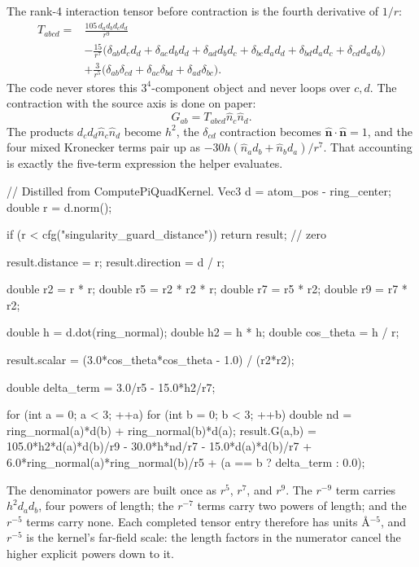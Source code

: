 \documentclass[11pt]{article}
\begin{document}
The rank-4 interaction tensor before contraction is the fourth derivative of
\(1/r\):
\[
\begin{aligned}
T_{abcd}={}&
  \frac{105\,d_a d_b d_c d_d}{r^9} \\
&-\frac{15}{r^7}\bigl(
  \delta_{ab}d_c d_d+\delta_{ac}d_b d_d+\delta_{ad}d_b d_c
 +\delta_{bc}d_a d_d+\delta_{bd}d_a d_c+\delta_{cd}d_a d_b\bigr)\\
&+\frac{3}{r^5}\bigl(
  \delta_{ab}\delta_{cd}
 +\delta_{ac}\delta_{bd}
 +\delta_{ad}\delta_{bc}\bigr).
\end{aligned}
\]
The code never stores this \(3^4\)-component object and never loops over
\(c,d\). The contraction with the source axis is done on paper:
\[
  G_{ab}=T_{abcd}\hat n_c\hat n_d .
\]
The products \(d_c d_d\hat n_c\hat n_d\) become \(h^2\), the
\(\delta_{cd}\) contraction becomes \(\hat{\bm n}\cdot\hat{\bm n}=1\), and
the four mixed Kronecker terms pair up as
\(-30h(\hat n_a d_b+\hat n_b d_a)/r^7\). That accounting is exactly the
five-term expression the helper evaluates.

\begin{codebox}
// Distilled from ComputePiQuadKernel.
Vec3 d = atom_pos - ring_center;
double r = d.norm();

if (r < cfg("singularity_guard_distance")) return result;  // zero

result.distance = r;
result.direction = d / r;

double r2 = r * r;
double r5 = r2 * r2 * r;
double r7 = r5 * r2;
double r9 = r7 * r2;

double h = d.dot(ring_normal);
double h2 = h * h;
double cos_theta = h / r;

result.scalar = (3.0*cos_theta*cos_theta - 1.0) / (r2*r2);

double delta_term = 3.0/r5 - 15.0*h2/r7;

for (int a = 0; a < 3; ++a) {
    for (int b = 0; b < 3; ++b) {
        double nd = ring_normal(a)*d(b) + ring_normal(b)*d(a);
        result.G(a,b) =
              105.0*h2*d(a)*d(b)/r9
            -  30.0*h*nd/r7
            -  15.0*d(a)*d(b)/r7
            +   6.0*ring_normal(a)*ring_normal(b)/r5
            + (a == b ? delta_term : 0.0);
    }
}
\end{codebox}

The denominator powers are built once as \(r^5\), \(r^7\), and \(r^9\).
The \(r^{-9}\) term carries \(h^2d_ad_b\), four powers of length;
the \(r^{-7}\) terms carry two powers of length; and the \(r^{-5}\) terms
carry none. Each completed tensor entry therefore has units
\(\si{\angstrom^{-5}}\), and \(r^{-5}\) is the kernel's far-field scale: the
length factors in the numerator cancel the higher explicit powers down to it.
\end{document}
